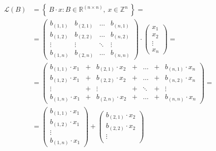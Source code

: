 \documentclass[runningheads]{llncs}
\numberwithin{equation}{section}
\begin{document}
    \begin{equation}
        \begin{split}     
            \mathcal{L}(B) & = \left\{\ B \cdot x: B \in {\mathbb{R}}^{(n \times n)},\ x \in {\mathbb{Z}}^{n}\ \right\} = \\
            & = \begin{pmatrix}
                {b}_{(1, 1)} & {b}_{(2, 1)} & \dots & {b}_{(n, 1)} \\
                {b}_{(1, 2)} & {b}_{(2, 2)} & \dots & {b}_{(n, 2)} \\
                \vdots & \vdots & \ddots & \vdots \\
                {b}_{(1, n)} & {b}_{(2, n)} & \dots & {b}_{(n, n)}
            \end{pmatrix} \cdot
            \begin{pmatrix}
                {x}_{1} \\ {x}_{2} \\ \vdots \\ {x}_{n}
            \end{pmatrix} = \\
            & = \begin{pmatrix}
                {b}_{(1, 1)} \cdot {x}_{1} & + & {b}_{(2, 1)} \cdot {x}_{2} & + & \dots & + & {b}_{(n, 1)} \cdot {x}_{n} \\
                {b}_{(1, 2)} \cdot {x}_{1} & + & {b}_{(2, 2)} \cdot {x}_{2} & + & \dots & + & {b}_{(n, 2)} \cdot {x}_{n} \\
                \vdots & + & \vdots & + & \ddots & + & \vdots \\
                {b}_{(1, n)} \cdot {x}_{1} & + & {b}_{(2, n)} \cdot {x}_{2} & + & \dots & + & {b}_{(n, n)} \cdot {x}_{n}
            \end{pmatrix} = \\
            & = \begin{pmatrix}
                {b}_{(1, 1)} \cdot {x}_{1} \\
                {b}_{(1, 2)} \cdot {x}_{1} \\
                \vdots \\
                {b}_{(1, n)} \cdot {x}_{1}
            \end{pmatrix} + 
            \begin{pmatrix}
                {b}_{(2, 1)} \cdot {x}_{2} \\
                {b}_{(2, 2)} \cdot {x}_{2} \\
                \vdots \\

\end{pmatrix}
\end{split}
\end{equation}
\end{document}
